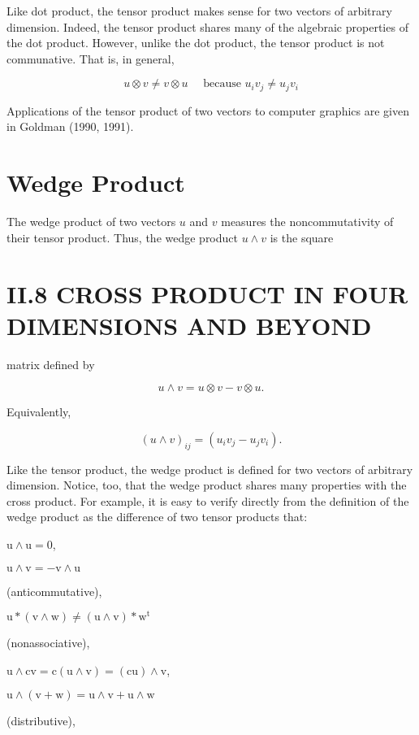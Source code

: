 \begin{CJK}{UTF8}{gbsn}
Like dot product, the tensor product makes sense for two vectors of arbitrary dimension. Indeed, the tensor product shares many of the algebraic properties of the dot product. However, unlike the dot product, the tensor product is not communative. That is, in general,

$$
u \otimes v \neq v \otimes u \quad \text { because } u_{i} v_{j} \neq u_{j} v_{i}
$$

Applications of the tensor product of two vectors to computer graphics are given in Goldman (1990, 1991).

\section{Wedge Product}
The wedge product of two vectors $u$ and $v$ measures the noncommutativity of their tensor product. Thus, the wedge product $u \wedge v$ is the square

\section{II.8 CROSS PRODUCT IN FOUR DIMENSIONS AND BEYOND}
matrix defined by

$$
u \wedge v=u \otimes v-v \otimes u .
$$

Equivalently,

$$
(u \wedge v)_{i j}=\left(u_{i} v_{j}-u_{j} v_{i}\right) .
$$

Like the tensor product, the wedge product is defined for two vectors of arbitrary dimension. Notice, too, that the wedge product shares many properties with the cross product. For example, it is easy to verify directly from the definition of the wedge product as the difference of two tensor products that:

$\mathrm{u} \wedge \mathrm{u}=0$,

$\mathrm{u} \wedge \mathrm{v}=-\mathrm{v} \wedge \mathrm{u}$

(anticommutative),

$\mathrm{u} *(\mathrm{v} \wedge \mathrm{w}) \neq(\mathrm{u} \wedge \mathrm{v}) * \mathrm{w}^{\mathrm{t}}$

(nonassociative),

$\mathrm{u} \wedge \mathrm{cv}=\mathrm{c}(\mathrm{u} \wedge \mathrm{v})=(\mathrm{cu}) \wedge \mathrm{v}$,

$\mathrm{u} \wedge(\mathrm{v}+\mathrm{w})=\mathrm{u} \wedge \mathrm{v}+\mathrm{u} \wedge \mathrm{w}$

(distributive),


\end{CJK}

